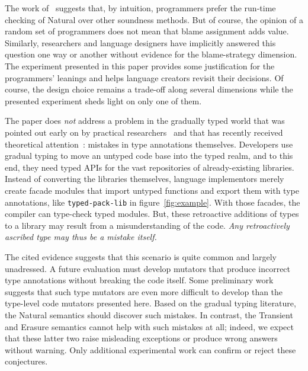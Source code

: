 
The work of~\citet{tgpk-dls-2018} suggests that, by intuition, programmers
prefer the run-time checking of Natural over other soundness methods. But of course,
the opinion of a random set of programmers does not mean that blame
assignment adds value. Similarly, researchers and language designers have
implicitly answered this question one way or another without evidence for the
blame-strategy dimension. The experiment presented in this paper provides some
justification for the programmers' leanings and helps language creators revisit
their decisions. Of course, the design choice remains a trade-off
along several dimensions while the presented experiment sheds light on
only one of them. 

The paper does {\em not\/} address a problem in the gradually typed world that
was pointed out early on by practical researchers~\citep{incorrect-ts,
sta-nt-base-types, wmwz-ecoop-2017} and that has recently received theoretical
attention~\citep{gfd-oopsla-2019, cc-oopsla-20}: mistakes in type annotations
themselves.  Developers use gradual typing to move an untyped code base into the
typed realm, and to this end, they need typed APIs for the vast repositories of
already-existing libraries. Instead of converting the libraries themselves,
language implementors merely create facade modules that import untyped functions
and export them with type annotations, like {\tt typed-pack-lib} in
figure~\ref{fig:example}.  With those facades, the compiler can 
type-check typed modules. But, these retroactive additions of types to a library
may result from a misunderstanding of the code. \emph{Any retroactively ascribed
type may thus be a mistake itself.}

The cited evidence suggests that this scenario is quite common and largely
unadressed.  A future evaluation must develop mutators that produce incorrect
type annotations without breaking the code itself. Some preliminary work
suggests that such type mutators are even more difficult to develop than the
type-level code mutators presented here. Based on the gradual typing literature,
the Natural semantics should discover such mistakes. In contrast, the Transient
and Erasure semantics cannot help with such mistakes at all; indeed, we expect
that these latter two raise misleading exceptions or produce wrong answers
without warning.  Only additional experimental work can confirm or reject these
conjectures.



